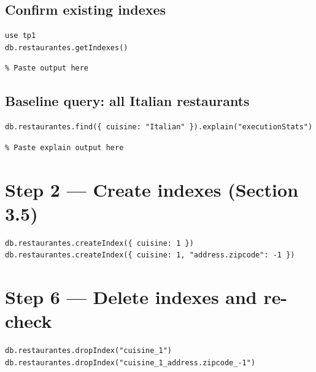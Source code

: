 \documentclass[11pt]{article}
\begin{document}
\subsection{Confirm existing indexes}
\begin{cmd}
\begin{verbatim}
use tp1
db.restaurantes.getIndexes()
\end{verbatim}
\end{cmd}

\begin{out}
\begin{verbatim}
% Paste output here
\end{verbatim}
\end{out}

\subsection{Baseline query: all Italian restaurants}
\begin{cmd}
\begin{verbatim}
db.restaurantes.find({ cuisine: "Italian" }).explain("executionStats")
\end{verbatim}
\end{cmd}

\begin{out}
\begin{verbatim}
% Paste explain output here
\end{verbatim}
\end{out}

\section{Step 2 — Create indexes (Section 3.5)}
\begin{cmd}
\begin{verbatim}
db.restaurantes.createIndex({ cuisine: 1 })
db.restaurantes.createIndex({ cuisine: 1, "address.zipcode": -1 })
\end{verbatim}
\end{cmd}

\section{Step 6 — Delete indexes and re-check}
\begin{cmd}
\begin{verbatim}
db.restaurantes.dropIndex("cuisine_1")
db.restaurantes.dropIndex("cuisine_1_address.zipcode_-1")
\end{verbatim}
\end{cmd}
\end{document}
